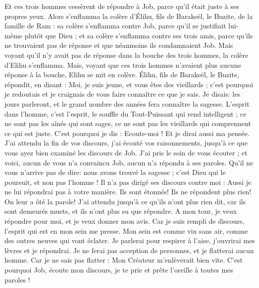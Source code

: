 \begin{multicols}{2}
\VerseOne{}Et ces trois hommes cessèrent de répondre à Job, parce qu'il était juste à ses propres yeux. 
Alors s'enflamma la colère d'Élihu, fils de Barakeël, le Buzite, de la famille de Ram : sa colère s'enflamma contre Job, parce qu'il se justifiait lui-même plutôt que Dieu ; 
et sa colère s'enflamma contre ses trois amis, parce qu'ils ne trouvaient pas de réponse et que néanmoins ils condamnaient Job. 
Mais voyant qu'il n'y avait pas de réponse dans la bouche des trois hommes, la colère d'Elihu s'enflamma.
Mais, voyant que ces trois hommes n'avaient plus aucune réponse à la bouche, Elihu se mit en colère.
Élihu, fils de Barakeël, le Buzite, répondit, en disant : Moi, je suis jeune, et vous êtes des vieillards ; c'est pourquoi je redoutais et je craignais de vous faire connaître ce que je sais. 
Je disais: les jours parleront, et le grand nombre des années fera connaître la sagesse.
L'esprit dans l'homme, c'est l'esprit, le souffle du Tout-Puissant qui rend intelligent ;
ce ne sont pas les aînés qui sont sages, ce ne sont pas les vieillards qui comprennent ce qui est juste.
C'est pourquoi je dis : Ecoute-moi ! Et je dirai aussi ma pensée.
J'ai attendu la fin de vos discours, j'ai écouté vos raisonnements, jusqu'à ce que vous ayez bien examiné les discours de Job.
J'ai pris le soin de vous écouter ; et voici, aucun de vous n'a convaincu Job, aucun n'a répondu à ses paroles.
Qu'il ne vous n'arrive pas de dire: nous avons trouvé la sagesse ; c'est Dieu qui le poursuit, et non pas l'homme !
Il n'a pas dirigé ses discours contre moi : Aussi je ne lui répondrai pas à votre manière.
Ils sont étonnés! Ils ne répondent plus rien! On leur a ôté la parole!
J'ai attendu jusqu'à ce qu'ils n'ont plus rien dit, car ils sont demeurés muets, et ils n'ont plus su que répondre.
A mon tour, je veux répondre pour moi, et je veux donner mon avis.
Car je suis rempli de discours, l'esprit qui est en mon sein me presse.
Mon sein est comme vin sans air, comme des outres neuves qui vont éclater.
Je parlerai pour respirer à l'aise, j'ouvrirai mes lèvres et je répondrai.
Je ne ferai pas acception de personnes, et je flatterai aucun homme.
Car je ne sais pas flatter : Mon Créateur m'enlèverait bien vite.
\VerseOne{}C'est pourquoi Job, écoute mon discours, je te prie et prête l'oreille à toutes mes paroles !

\end{multicols}
